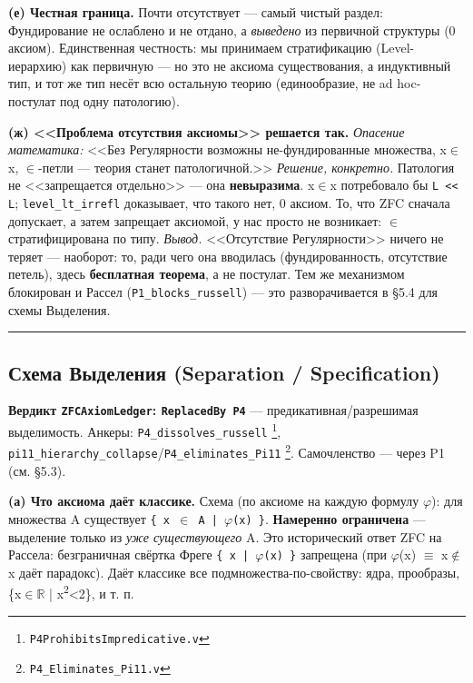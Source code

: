 \documentclass[11pt,a4paper]{article}
\begin{document}
\textbf{(е) Честная граница.} Почти отсутствует --- самый чистый раздел: Фундирование не ослаблено и не отдано, а \emph{выведено} из первичной структуры (0 аксиом). Единственная честность: мы принимаем стратификацию (Level-иерархию) как первичную --- но это не аксиома существования, а индуктивный тип, и тот же тип несёт всю остальную теорию (единообразие, не ad hoc-постулат под одну патологию).

\textbf{(ж) <<Проблема отсутствия аксиомы>> решается так.} \emph{Опасение математика:} <<Без Регулярности возможны не-фундированные множества, x$\in$x, $\in$-петли --- теория станет патологичной.>> \emph{Решение, конкретно.} Патология не <<запрещается отдельно>> --- она \textbf{невыразима}. x$\in$x потребовало бы \texttt{L << L}; \texttt{level\_\allowbreak{}lt\_\allowbreak{}irrefl} доказывает, что такого нет, 0 аксиом. То, что ZFC сначала допускает, а затем запрещает аксиомой, у нас просто не возникает: $\in$ стратифицирована по типу. \emph{Вывод.} <<Отсутствие Регулярности>> ничего не теряет --- наоборот: то, ради чего она вводилась (фундированность, отсутствие петель), здесь \textbf{бесплатная теорема}, а не постулат. Тем же механизмом блокирован и Рассел (\texttt{P1\_\allowbreak{}blocks\_\allowbreak{}russell}) --- это разворачивается в \S{}5.4 для схемы Выделения.

\bigskip\hrule\bigskip

\subsection{Схема Выделения (Separation / Specification)}

\textbf{Вердикт \texttt{ZFCAxiom\allowbreak{}Ledger}: \texttt{Replaced\allowbreak{}By P4}} --- предикативная/разрешимая выделимость. Анкеры: \texttt{P4\_\allowbreak{}dissolves\_\allowbreak{}russell} \footnote{\texttt{P4Prohibits\allowbreak{}Impredicative.v}}, \texttt{pi11\_\allowbreak{}hierarchy\_\allowbreak{}collapse}/\texttt{P4\_\allowbreak{}eliminates\_\allowbreak{}Pi11} \footnote{\texttt{P4\_\allowbreak{}Eliminates\_\allowbreak{}Pi11.v}}. Самочленство --- через P1 (см. \S{}5.3).

\textbf{(а) Что аксиома даёт классике.} Схема (по аксиоме на каждую формулу $\varphi$): для множества A существует \texttt{\{ x $\in$ A | $\varphi$(x) \}}. \textbf{Намеренно ограничена} --- выделение только из \emph{уже существующего} A. Это исторический ответ ZFC на Рассела: безграничная свёртка Фреге \texttt{\{ x | $\varphi$(x) \}} запрещена (при $\varphi$(x) $\equiv$ x$\notin$x даёт парадокс). Даёт классике все подмножества-по-свойству: ядра, прообразы, \{x$\in$$\mathbb{R}$ | x\textsuperscript{2}<2\}, и т. п.
\end{document}
